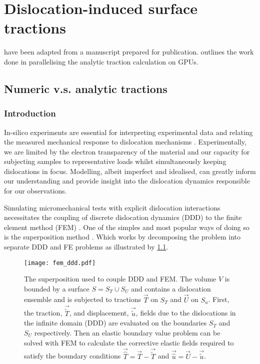 \chapter{Dislocation-induced surface tractions}
\label{c:tractions}

 have been adapted from a manuscript prepared for publication.  outlines the work done in parallelising the analytic traction calculation on GPUs.

\section{Numeric v.s. analytic tractions}\label{s:numericVsAnalytic}

\subsection{Introduction}\label{ss:paperIntro}

In-silico experiments are essential for interpreting experimental data and relating the measured mechanical response to dislocation mechanisms \cite{0965-0393-6-6-007,doi:10.1080/14786430500341250,tarleton2015discrete,YU2018}. Experimentally, we are limited by the electron transparency of the material and our capacity for subjecting samples to representative loads whilst simultaneously keeping dislocations in focus. Modelling, albeit imperfect and idealised, can greatly inform our understanding and provide insight into the dislocation dynamics responsible for our observations.

Simulating micromechanical tests with explicit dislocation interactions necessitates the coupling of discrete dislocation dynamics (DDD) to the finite element method (FEM) \cite{Groh2009}. One of the simples and most popular ways of doing so is the superposition method \cite{superposition_scheme0,superposition_scheme1,superposition_scheme2}. Which works by decomposing the problem into separate DDD and FE problems as illustrated by \cref{f:superposition_scheme}.
\begin{figure}
    \centering
    \texttt{[image: fem\_ddd.pdf]}
    \caption[Superposition Model for DDD-FEM coupling.]{The superposition used to couple DDD and FEM. The volume $V$ is bounded by a surface $S = S_{T} \cup S_{U}$ and contains a dislocation ensemble and is subjected to tractions $\vec{T}$ on $S_{T}$ and $\vec{U}$ on $S_{u}$. First, the traction, $\vec{\tilde{T}}$, and displacement, $\vec{\tilde{u}}$, fields due to the dislocations in the infinite domain (DDD) are evaluated on the boundaries $S_{T}$ and $S_{U}$ respectively. Then an elastic boundary value problem can be solved with FEM to calculate the corrective elastic fields required to satisfy the boundary conditions $\vec{\hat{T}} = \vec{T} - \vec{\tilde{T}}$ and $\vec{\hat{u}} = \vec{U} - \vec{\tilde{u}}$.}
    \label{f:superposition_scheme}
\end{figure}

